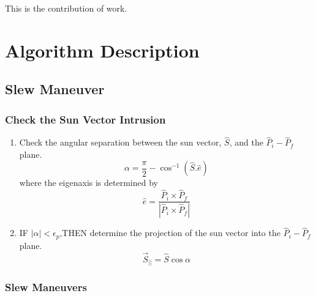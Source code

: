 \documentclass[letterpaper, preprint, paper,11pt]{AAS}	%
\begin{document}
		This is the contribution of work. 

\section{Algorithm Description} 

	\subsection{Slew Maneuver} 
	
		\subsubsection{Check the Sun Vector Intrusion}
			\begin{enumerate}
				\item Check the angular separation between the sun vector, $\hat{S}$, and the $\hat{P}_i-\hat{P}_f$ plane.
				\begin{equation}
				\alpha=\frac{\pi}{2}-\cos^{-1}(\hat{S}.\hat{e})
				\end{equation}
				where the eigenaxis is determined by
				\begin{equation}\label{eaxis}
				\hat{e}=\frac{\hat{P}_i\times\hat{P}_f}{|\hat{P}_i\times \hat{P}_f|}
				\end{equation} 
				
				\item IF $|\alpha|<\epsilon_p$,THEN determine the projection of the sun vector into the $\hat{P}_i-\hat{P}_f$ plane.
				\begin{equation}\label{Sbar}
				\vec{S}_{||}=\hat{S}\cos\alpha
				\end{equation}
			\end{enumerate}
		
		\subsubsection{Slew Maneuvers}
		
\end{document}
